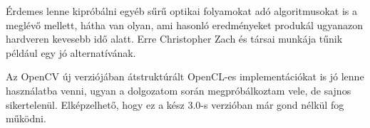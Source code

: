 Érdemes lenne kipróbálni egyéb sűrű optikai folyamokat adó algoritmusokat is a meglévő mellett, hátha van olyan, ami hasonló eredményeket produkál ugyanazon hardveren kevesebb idő alatt. Erre Christopher Zach és társai \cite{zach2007duality} munkája tűnik például egy jó alternatívának.

Az OpenCV új verziójában átstruktúrált OpenCL-es implementációkat is jó lenne használatba venni, ugyan a dolgozatom során megpróbálkoztam vele, de sajnos sikertelenül. Elképzelhető, hogy ez a kész 3.0-s verzióban már gond nélkül fog működni.


